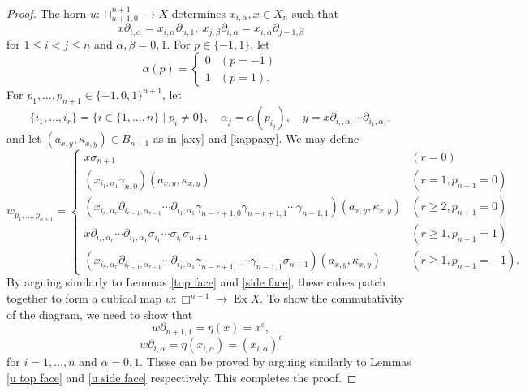 \documentclass[oneside, 12pt]{amsart}
\numberwithin{equation}{section}
\theoremstyle{plain}
\theoremstyle{definition}
\theoremstyle{remark}
\newcommand{\ex}{\operatorname{Ex}}
\begin{document}
	\begin{proof}
		The horn $u\colon\sqcap_{n+1,0}^{n+1}\to X$ determines $x_{i,\alpha},x\in X_n$ such that
		\[
		x\partial_{i,\alpha}=x_{i,\alpha}\partial_{n,1},\ x_{j,\beta}\partial_{i,\alpha}=x_{i,\alpha}\partial_{j-1,\beta}
		\]
		for $1\le i<j\le n$ and $\alpha,\beta=0,1$. For $p\in\{-1,1\}$, let
		\[
		\alpha(p)=\begin{cases}
			0&(p=-1)\\
			1&(p=1).
		\end{cases}
		\]For $p_1,\ldots,p_{n+1}\in\{-1,0,1\}^{n+1}$, let 
		\[
		\{i_1,\ldots,i_r\}=\{i\in\{1,\ldots,n\}\mid p_i\ne0\},\quad\alpha_j=\alpha(p_{i_j}),\quad y=x\partial_{i_r,\alpha_r}\cdots\partial_{i_1,\alpha_1},
		\]
		and let $(a_{x,y},\kappa_{x,y})\in B_{n+1}$ as in \eqref{axy} and \eqref{kappaxy}. We may define 
		\[
		w_{p_1,\ldots,p_{n+1}}=
		\begin{cases}
			x\sigma_{n+1}&(r=0)\\
			(x_{i_1,\alpha_1}\gamma_{n,0})(a_{x,y},\kappa_{x,y})&(r=1,p_{n+1}=0)\\
			(x_{i_r,\alpha_r}\partial_{i_{r-1},\alpha_{r-1}}\cdots\partial_{i_1,\alpha_1}\gamma_{n-r+1,0}\gamma_{n-r+1,1}\cdots\gamma_{n-1,1})(a_{x,y},\kappa_{x,y})&(r\ge 2,p_{n+1}=0)\\
			x\partial_{i_r,\alpha_r}\cdots\partial_{i_1,\alpha_1}\sigma_{i_1}\cdots\sigma_{i_r}\sigma_{n+1}&(r\ge1,p_{n+1}=1)\\
			(x_{i_r,\alpha_r}\partial_{i_{r-1},\alpha_{r-1}}\cdots\partial_{i_1,\alpha_1}\gamma_{n-r+1,1}\cdots\gamma_{n-1,1}\sigma_{n+1})(a_{x,y},\kappa_{x,y})&(r\ge1,p_{n+1}=-1).
		\end{cases}
		\]
		By arguing similarly to Lemmas \ref{top face} and \ref{side face}, these cubes patch together to form a cubical map $w\colon\Box^{n+1}\to\ex X$. To show the commutativity of the diagram, we need to show that
		\begin{equation}
			\label{ex top face}
			w\partial_{n+1,1}=\eta(x)=x^\epsilon,
		\end{equation}
		\begin{equation}
			\label{ex side face}
			w\partial_{i,\alpha}=\eta(x_{i,\alpha})=(x_{i,\alpha})^\epsilon
		\end{equation}
		for $i=1,\ldots,n$ and $\alpha=0,1$. These can be proved by arguing similarly to Lemmas \ref{u top face} and \ref{u side face} respectively. This completes the proof.
	\end{proof}
	
\end{document}
